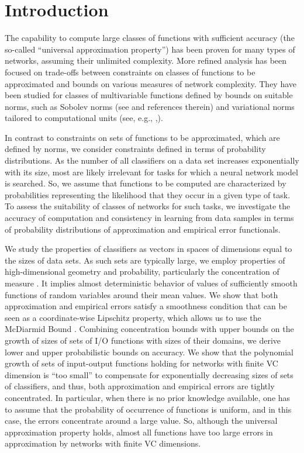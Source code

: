 \documentclass{elsarticle}
\begin{document}
\section{Introduction}

The capability to compute large classes of functions with sufficient accuracy (the so-called ``universal approximation property'') has been proven for many types of networks, assuming their unlimited complexity. More refined analysis has been focused on trade-offs between constraints on classes of functions to be approximated and bounds on various measures of network complexity. They have been studied for classes of multivariable functions defined by bounds on suitable norms, such as Sobolev norms (see \cite{yazh20} and references therein) and variational norms tailored to computational units (see, e.g., \cite{ba93},\cite{vk12}).

In contrast to constraints on sets of functions to be approximated, which are defined by norms, we consider constraints defined in terms of probability distributions. As the number of all classifiers on a data set increases exponentially with its size, most are likely irrelevant for tasks for which a neural network model is searched. So, we assume that functions to be computed are characterized by probabilities representing the likelihood that they occur in a given type of task. To assess the suitability of classes of networks for such tasks, we investigate the accuracy of computation and consistency in learning from data samples in terms of probability distributions of approximation and empirical error functionals.

We study the properties of classifiers as vectors in spaces of dimensions equal to the sizes of data sets. As such sets are typically large, we employ properties of high-dimensional geometry and probability, particularly the concentration of measure \cite{misc86,le01,dupa09}. It implies almost deterministic behavior of values of sufficiently smooth functions of random variables around their mean values. We show that both approximation and empirical errors satisfy a smoothness condition that can be seen as a coordinate-wise Lipschitz property, which allows us to use the McDiarmid Bound \cite{mc89}. Combining concentration bounds with upper bounds on the growth of sizes of sets of I/O functions with sizes of their domains, we derive lower and upper probabilistic bounds on accuracy. We show that the polynomial growth of sets of input-output functions holding for networks with finite VC dimension is ``too small'' to compensate for exponentially decreasing sizes of sets of classifiers, and thus, both approximation and empirical errors are tightly concentrated.
In particular, when there is no prior knowledge available, one has to assume that the probability of occurrence of functions is uniform, and in this case, the errors concentrate around a large value. So, although the universal approximation property holds, almost all functions have too large errors in approximation by networks with finite VC dimensions.
\end{document}
